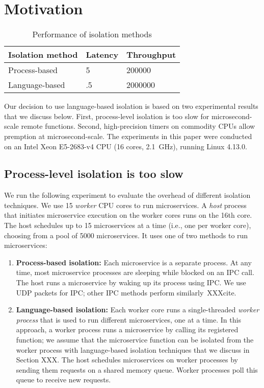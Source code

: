 \section{Motivation}
\label{sec:motive}

\begin{table}
\begin{center}
\small
\begin{tabular}{lll}
\textbf{Isolation method} & \textbf{Latency} & \textbf{Throughput} \\
\midrule
Process-based & 5 & 200000 \\
Language-based & .5 & 2000000 \\
\end{tabular}
\caption{Performance of isolation methods}
\label{tab:isolation_methods}
\end{center}
\end{table}

Our decision to use language-based isolation is based on two experimental
results that we discuss below. First, process-level isolation is too slow for
microsecond-scale remote functions. Second, high-precision timers on commodity
CPUs allow premption at microsecond-scale. The experiments in this paper were
conducted on an Intel Xeon E5-2683-v4 CPU (16 cores, 2.1~GHz), running
Linux 4.13.0.

\subsection{Process-level isolation is too slow}
We run the following experiment to evaluate the overhead of different isolation
techniques. We use 15 \emph{worker} CPU cores to run microservices. A \emph{host}
process that initiates microservice execution on the worker cores runs on the
16th core. The host schedules up to 15 microservices at a time (i.e., one
per worker core), choosing from a pool of 5000 microservices. It uses one of two
methods to run microservices:

\begin{enumerate}
\item \textbf{Process-based isolation:} Each microservice is a separate process.
At any time, most microservice processes are sleeping while blocked on an IPC
call. The host runs a microservice by waking up its process using IPC. We use
UDP packets for IPC; other IPC methods perform similarly~XXXcite.
\item \textbf{Language-based isolation:} Each worker core runs a single-threaded
\emph{worker process} that is used to run different microservices, one at a time.
In this approach, a worker process runs a microservice by calling its registered
function; we assume that the microservice function can be isolated from the
worker process with language-based isolation techniques that we discuss in
Section XXX. The host schedules microservices on worker processes by sending them
requests on a shared memory queue. Worker processes poll this queue to receive
new requests.
\end{enumerate}

